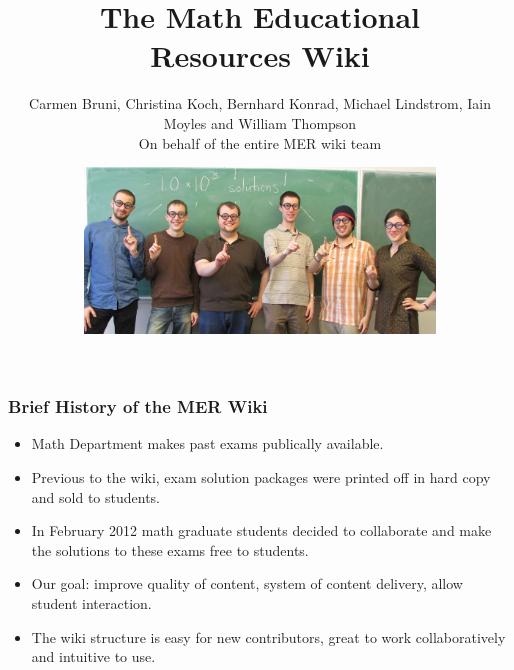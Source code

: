 \documentclass{beamer}
\title[The Math Educational Resources Wiki]{{\bf\Huge The Math Educational \\[.25cm] Resources Wiki}}
\institute{The University of British Columbia}
\author{{\small Carmen Bruni, Christina Koch, Bernhard Konrad, Michael Lindstrom, Iain Moyles and William Thompson\\
On behalf of the entire MER wiki team}}
\date{
\includegraphics[width=0.7\textwidth]{MER_nerds.png}
}
\begin{document}
\frame{ \titlepage }


\frame
{
\frametitle{\bf{Brief History of the MER Wiki}}

  \begin{block}{}

      \begin{itemize}
      \item Math Department makes past exams publically available.
      \item Previous to the wiki, exam solution packages were printed off in hard copy and sold to students.
      \item In February 2012 math graduate students decided to collaborate and make the solutions to these exams free to students.
      \item Our goal: improve quality of content, system of content delivery, allow student interaction.
	  \item The wiki structure is easy for new contributors, great to work collaboratively and intuitive to use.

      \end{itemize}
\end{block}
}
\end{document}

